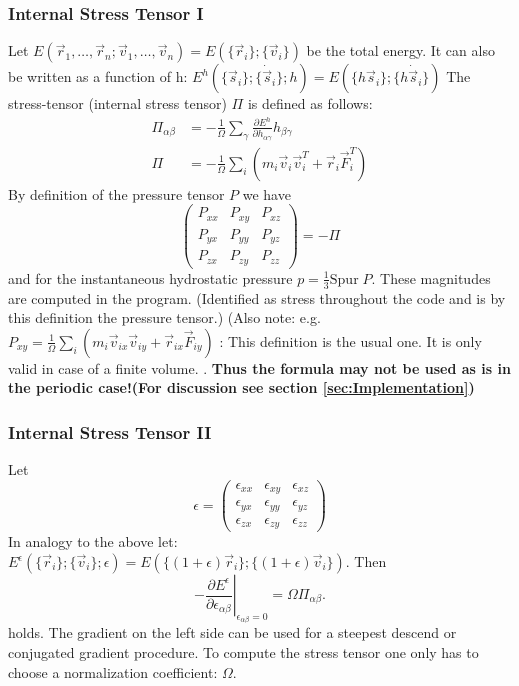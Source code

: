 \subsubsection{Internal Stress Tensor I}
\label{subsec:StressTensor}
Let \( E(\vec{r}_1, \dots, \vec{r}_n; \vec{v}_1, \dots, \vec{v}_n) = E(\{\vec{r}_i\}; \{\vec{v}_i\})\) be the total energy. It can also be written as a function of h: \( E^h(\{\vec{s}_i\}; \{\dot{\vec{s}}_i\}; h) = E(\{h\vec{s}_i\}; \{h\dot{\vec{s}}_i\})\)
The stress-tensor (internal stress tensor) \( \Pi \) is defined as follows:
\begin{equation*}
  \begin{split}
    \Pi_{\alpha \beta}  
    & = -\frac{1}{\Omega} \sum_\gamma \frac{\partial E^h}{\partial h_{\alpha \gamma}}h_{\beta \gamma} \\
    \Pi
    & = -\frac{1}{\Omega} \sum_i \left( m_i\vec{v}_i\vec{v}_i^T + \vec{r}_i\vec{F}_i^T \right)
  \end{split}
\end{equation*}
By definition of the pressure tensor \( P \) we have
\[ \left(
  \begin{array}{ccc}
    P_{xx} & P_{xy} & P_{xz} \\
    P_{yx} & P_{yy} & P_{yz} \\
    P_{zx} & P_{zy} & P_{zz}  
  \end{array}
\right)=-\Pi 
\]
 and for the instantaneous hydrostatic pressure \( p = \frac{1}{3}\mathrm{Spur}\;P \). These magnitudes are computed in the program. (Identified as stress throughout the code and is by this definition the pressure tensor.) (Also note:  e.g. \(P_{xy} = \frac{1}{\Omega} \sum_i \left( m_i\vec{v}_{ix}\vec{v}_{iy} + \vec{r}_{ix}\vec{F}_{iy} \right)\)
: This definition is the usual one. It is only valid in case of a finite volume. . \textbf{Thus the formula may not be used as is in the periodic case!(For discussion see section \ref{sec:Implementation})}


\subsubsection{Internal Stress Tensor II}
Let 
\[ \epsilon = \left(
  \begin{array}{ccc}
    \epsilon_{xx} & \epsilon_{xy} & \epsilon_{xz} \\
    \epsilon_{yx} & \epsilon_{yy} & \epsilon_{yz} \\
    \epsilon_{zx} & \epsilon_{zy} & \epsilon_{zz}  
  \end{array} 
\right)
\]
In analogy to the above let: \( E^\epsilon(\{\vec{r}_i\}; \{\vec{v}_i\}; \epsilon) = E(\{(1+\epsilon)\vec{r}_i\}; \{(1+\epsilon)\vec{v}_i\})\). Then
\[
\left. -\frac{\partial E^\epsilon}{\partial \epsilon_{\alpha \beta}} \right|_{\epsilon_{\alpha \beta} = 0} = \Omega  \Pi_{\alpha \beta}.
\]
holds. The gradient on the left side can be used for a steepest descend or conjugated gradient procedure. To compute the stress tensor one only has to choose a normalization coefficient: \(\Omega \). 

